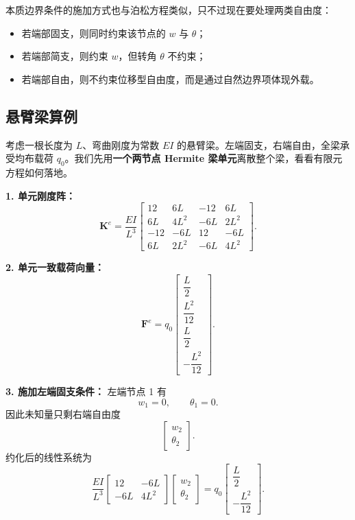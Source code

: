 \documentclass[11pt, a4paper, UTF8]{ctexart}
\begin{document}
本质边界条件的施加方式也与泊松方程类似，只不过现在要处理两类自由度：
\begin{itemize}
    \item 若端部固支，则同时约束该节点的 $w$ 与 $\theta$；
    \item 若端部简支，则约束 $w$，但转角 $\theta$ 不约束；
    \item 若端部自由，则不约束位移型自由度，而是通过自然边界项体现外载。
\end{itemize}

\subsection{悬臂梁算例}
考虑一根长度为 $L$、弯曲刚度为常数 $EI$ 的悬臂梁。左端固支，右端自由，全梁承受均布载荷 $q_0$。我们先用\textbf{一个两节点 Hermite 梁单元}离散整个梁，看看有限元方程如何落地。

\textbf{1. 单元刚度阵：}
\[
\bm{K}^e
=
\frac{EI}{L^3}
\begin{bmatrix}
12 & 6L & -12 & 6L \\
6L & 4L^2 & -6L & 2L^2 \\
-12 & -6L & 12 & -6L \\
6L & 2L^2 & -6L & 4L^2
\end{bmatrix}.
\]

\textbf{2. 单元一致载荷向量：}
\[
\bm{F}^e
=
q_0
\begin{bmatrix}
\dfrac{L}{2} \\
\dfrac{L^2}{12} \\
\dfrac{L}{2} \\
-\dfrac{L^2}{12}
\end{bmatrix}.
\]

\textbf{3. 施加左端固支条件：}
左端节点 1 有
\[
w_1 = 0,\qquad \theta_1 = 0.
\]
因此未知量只剩右端自由度
\[
\begin{bmatrix}
w_2 \\ \theta_2
\end{bmatrix}.
\]
约化后的线性系统为
\[
\frac{EI}{L^3}
\begin{bmatrix}
12 & -6L \\
-6L & 4L^2
\end{bmatrix}
\begin{bmatrix}
w_2 \\ \theta_2
\end{bmatrix}
=
q_0
\begin{bmatrix}
\dfrac{L}{2} \\
-\dfrac{L^2}{12}
\end{bmatrix}.
\]
\end{document}
